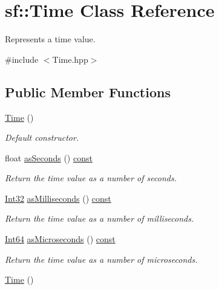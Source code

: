 \hypertarget{classsf_1_1_time}{\section{sf\-:\-:Time Class Reference}
\label{classsf_1_1_time}
}


Represents a time value.  




{\ttfamily \#include $<$Time.\-hpp$>$}

\subsection*{Public Member Functions}
\begin{DoxyCompactItemize}
\item 
\hyperlink{classsf_1_1_time_acba0cfbc49e3a09a22a8e079eb67a05c}{Time} ()
\begin{DoxyCompactList}\small\item\em Default constructor. \end{DoxyCompactList}\item 
float \hyperlink{classsf_1_1_time_a7538140d095e48da9d7eee015dd455a9}{as\-Seconds} () \hyperlink{term__entry_8h_a57bd63ce7f9a353488880e3de6692d5a}{const} 
\begin{DoxyCompactList}\small\item\em Return the time value as a number of seconds. \end{DoxyCompactList}\item 
\hyperlink{namespacesf_ac2dfd4952377a26dee4750e2e4a30a15}{Int32} \hyperlink{classsf_1_1_time_a85e6deb41fa71896508ce0f64059a6ae}{as\-Milliseconds} () \hyperlink{term__entry_8h_a57bd63ce7f9a353488880e3de6692d5a}{const} 
\begin{DoxyCompactList}\small\item\em Return the time value as a number of milliseconds. \end{DoxyCompactList}\item 
\hyperlink{namespacesf_a2840579fed3494d9f330baf7a5a19903}{Int64} \hyperlink{classsf_1_1_time_ae41a7e0ca73ceea771b3c150c12abdd2}{as\-Microseconds} () \hyperlink{term__entry_8h_a57bd63ce7f9a353488880e3de6692d5a}{const} 
\begin{DoxyCompactList}\small\item\em Return the time value as a number of microseconds. \end{DoxyCompactList}\item 
\hyperlink{classsf_1_1_time_acba0cfbc49e3a09a22a8e079eb67a05c}{Time} ()

\end{DoxyCompactItemize}
